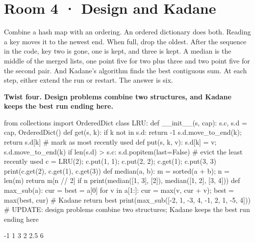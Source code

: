 \documentclass[11pt,a4paper]{report}
\begin{document}
\section*{Room 4 · Design and Kadane}
Combine a hash map with an ordering. An ordered dictionary does both. Reading a key moves it to the newest end. When full, drop the oldest. After the sequence in the code, key two is gone, one is kept, and three is kept. A median is the middle of the merged lists, one point five for two plus three and two point five for the second pair. And Kadane's algorithm finds the best contiguous sum. At each step, either extend the run or restart. The answer is six.
\begin{tcolorbox}[colback=yellow!12,colframe=orange!70!black,boxrule=0.4pt,left=4pt,right=4pt,top=2pt,bottom=2pt]\textbf{Twist four. Design problems combine two structures, and Kadane keeps the best run ending here.}\end{tcolorbox}
\begin{Code}
from collections import OrderedDict
class LRU:
    def __init__(s, cap): s.c, s.d = cap, OrderedDict()
    def get(s, k):
        if k not in s.d: return -1
        s.d.move_to_end(k); return s.d[k]   # mark as most recently used
    def put(s, k, v):
        s.d[k] = v; s.d.move_to_end(k)
        if len(s.d) > s.c: s.d.popitem(last=False)   # evict the least recently used
c = LRU(2); c.put(1, 1); c.put(2, 2); c.get(1); c.put(3, 3)
print(c.get(2), c.get(1), c.get(3))
def median(a, b):
    m = sorted(a + b); n = len(m)
    return m[n // 2] if n %
print(median([1, 3], [2]), median([1, 2], [3, 4]))
def max_sub(a):
    cur = best = a[0]
    for v in a[1:]: cur = max(v, cur + v); best = max(best, cur)   # Kadane
    return best
print(max_sub([-2, 1, -3, 4, -1, 2, 1, -5, 4]))
# UPDATE: design problems combine two structures; Kadane keeps the best run ending here
\end{Code}
\begin{Out}
-1 1 3
2 2.5
6
\end{Out}
\end{document}
